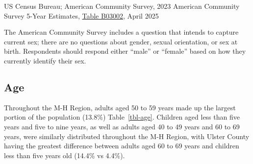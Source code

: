 \documentclass[
  english,
  letterpaper,
]{report}
\begin{document}
\begin{tcolorbox}[enhanced jigsaw, breakable, leftrule=.75mm, title=\textcolor{quarto-callout-note-color}{\faInfo}\hspace{0.5em}{Source}, bottomrule=.15mm, opacityback=0, left=2mm, colback=white, bottomtitle=1mm, coltitle=black, colbacktitle=quarto-callout-note-color!10!white, colframe=quarto-callout-note-color-frame, opacitybacktitle=0.6, toptitle=1mm, titlerule=0mm, arc=.35mm, rightrule=.15mm, toprule=.15mm]

US Census Bureau; American Community Survey, 2023 American Community
Survey 5-Year Estimates,
\href{https://data.census.gov/table/ACSDT5Y2023.B03002?q=b03002&g=050XX00US36105,36027,36071,36119,36087,36079,36111_160XX00US3651000_040XX00US36}{Table
B03002}, April 2025

\end{tcolorbox}

\begin{tcolorbox}[enhanced jigsaw, breakable, leftrule=.75mm, title=\textcolor{quarto-callout-note-color}{\faInfo}\hspace{0.5em}{Note}, bottomrule=.15mm, opacityback=0, left=2mm, colback=white, bottomtitle=1mm, coltitle=black, colbacktitle=quarto-callout-note-color!10!white, colframe=quarto-callout-note-color-frame, opacitybacktitle=0.6, toptitle=1mm, titlerule=0mm, arc=.35mm, rightrule=.15mm, toprule=.15mm]

The American Community Survey includes a question that intends to
capture current sex; there are no questions about gender, sexual
orientation, or sex at birth. Respondents should respond either ``male''
or ``female'' based on how they currently identify their sex.

\end{tcolorbox}

\subsection{Age}\label{age}

Throughout the M-H Region, adults aged 50 to 59 years made up the
largest portion of the population (13.8\%) Table~\ref{tbl-age}. Children
aged less than five years and five to nine years, as well as adults aged
40 to 49 years and 60 to 69 years, were similarly distributed throughout
the M-H Region, with Ulster County having the greatest difference
between adults aged 60 to 69 years and children less than five years old
(14.4\% vs 4.4\%).
\end{document}
